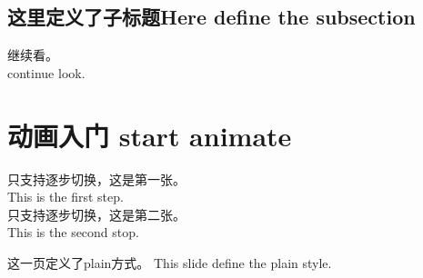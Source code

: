 \documentclass{beamer}
\begin{document}
        \subsection{这里定义了子标题Here define the subsection} %
        \begin{frame}
            
            继续看。\\
            continue look.
        \end{frame}
        \section{动画入门 start animate}
        \begin{frame}

            只支持逐步切换，这是第一张。\\
            This is the first step.\\
            \pause
            只支持逐步切换，这是第二张。\\
            This is the second stop.
            
        \end{frame}
         

        \begin{frame}
            \frame[plain]
            这一页定义了plain方式。
            This slide define the plain style.
        \end{frame}

    
\end{document}
